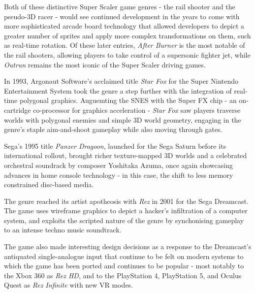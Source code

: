 \documentclass{article}
\begin{document}
Both of these distinctive Super Scaler game genres - the rail shooter and the pseudo-3D
racer - would see continued development in the years to come with more sophisticated arcade board
technology that allowed developers to depict a greater number of sprites and apply more complex
transformations on them, such as real-time rotation. Of these later entries, \textit{After Burner} is the
most notable of the rail shooters, allowing players to take control of a supersonic fighter jet, while
\textit{Outrun} remains the most iconic of the Super Scaler driving games.

In 1993, Argonaut Software's acclaimed title \textit{Star Fox} for the Super Nintendo Entertainment
System took the genre a step further with the integration of real-time polygonal graphics. Auguemting
the SNES with the Super FX chip - an on-cartridge co-processor for graphics acceleration -
\textit{Star Fox} saw players traverse worlds with polygonal enemies and simple 3D world geometry,
engaging in the genre's staple aim-and-shoot gameplay while also moving through gates.

Sega's 1995 title \textit{Panzer Dragoon}, launched for the Sega Saturn before its international
rollout, brought richer texture-mapped 3D worlds and a celebrated orchestral soundrack by composer
Yoshitaka Azuma, once again showcasing advances in home console technology - in this case, the
shift to less memory constrained disc-based media.

The genre reached its artist apotheosis with \textit{Rez} in 2001 for the Sega Dreamcast.
The game uses wireframe graphics to depict a hacker's infiltration of a computer system, and exploits the
scripted nature of the genre by synchonising gameplay to an intense techno music soundtrack.

The game also made interesting design decisions as a response to the Dreamcast's antiquated
single-analogue input that continue to be felt on modern systems to which the game has been ported and
continues to be popular - most notably to the Xbox 360 as \textit{Rez HD}, and to the PlayStation 4,
PlayStation 5, and Oculus Quest as \textit{Rez Infinite} with new VR modes.
\end{document}
